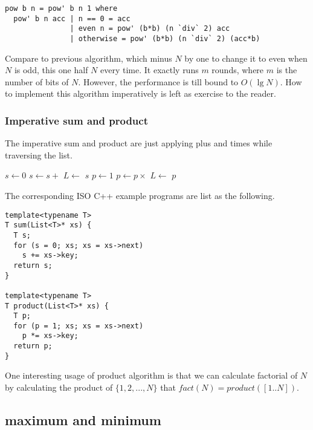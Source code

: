 \documentclass{article}
\begin{document}
\lstset{language=Haskell}
\begin{lstlisting}
pow b n = pow' b n 1 where
  pow' b n acc | n == 0 = acc
               | even n = pow' (b*b) (n `div` 2) acc
               | otherwise = pow' (b*b) (n `div` 2) (acc*b)
\end{lstlisting}

Compare to previous algorithm, which minus $N$ by one to change it to even when $N$ is odd, this one half $N$ every
time. It exactly runs $m$ rounds, where $m$ is the number of bits of $N$. However, the performance is till bound to 
$O(\lg N)$. How to implement this algorithm imperatively is left as exercise to the reader.

\subsubsection{Imperative sum and product}
The imperative sum and product are just applying plus and times while traversing the list.

\begin{algorithmic}
  \State $s \gets 0$
    \State $s \gets s +$ 
    \State $L \gets$ 
  \EndWhile
  \State \Return $s$
\EndFunction
\Statex
{}
  \State $p \gets 1$
    \State $p \gets p \times $ 
    \State $L \gets$ 
  \EndWhile
  \State \Return $p$
\EndFunction
\end{algorithmic}

The corresponding ISO C++ example programs are list as the following.

\lstset{language=C++}
\begin{lstlisting}
template<typename T>
T sum(List<T>* xs) {
  T s;
  for (s = 0; xs; xs = xs->next)
    s += xs->key;
  return s;
}

template<typename T>
T product(List<T>* xs) {
  T p;
  for (p = 1; xs; xs = xs->next)
    p *= xs->key;
  return p;
}
\end{lstlisting}

One interesting usage of product algorithm is that we can calculate factorial of $N$ by calculating the
product of $\{1, 2, ..., N\}$ that $fact(N) = product([1..N])$.

\subsection{maximum and minimum}
\end{document}
